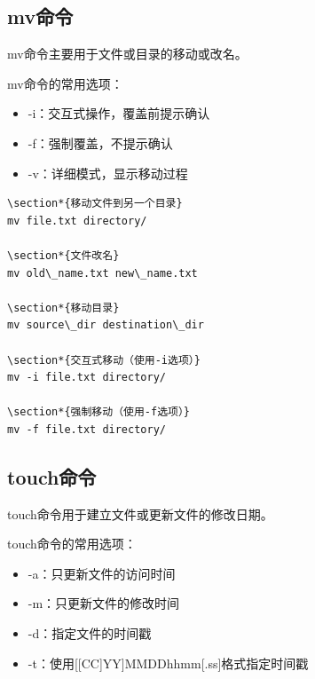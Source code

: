 \documentclass[12pt,UTF8]{ctexbook}
\begin{document}
\subsection{mv命令}
mv命令主要用于文件或目录的移动或改名。

mv命令的常用选项：
\begin{itemize}
    \item -i：交互式操作，覆盖前提示确认
    \item -f：强制覆盖，不提示确认
    \item -v：详细模式，显示移动过程
\end{itemize}

\begin{verbatim}
\section*{移动文件到另一个目录}
mv file.txt directory/

\section*{文件改名}
mv old\_name.txt new\_name.txt

\section*{移动目录}
mv source\_dir destination\_dir

\section*{交互式移动（使用-i选项）}
mv -i file.txt directory/

\section*{强制移动（使用-f选项）}
mv -f file.txt directory/
\end{verbatim}

\subsection{touch命令}
touch命令用于建立文件或更新文件的修改日期。

touch命令的常用选项：
\begin{itemize}
    \item -a：只更新文件的访问时间
    \item -m：只更新文件的修改时间
    \item -d：指定文件的时间戳
    \item -t：使用[[CC]YY]MMDDhhmm[.ss]格式指定时间戳
\end{itemize}
\end{document}
